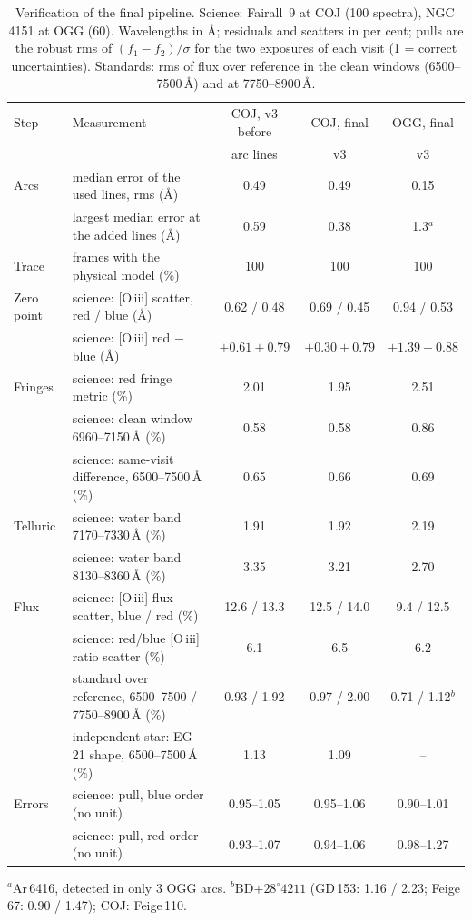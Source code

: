 \begin{table}[!htbp]
\centering
\caption{Verification of the final pipeline. Science: Fairall~9 at COJ (100 spectra), NGC\,4151 at OGG (60). Wavelengths
in \AA; residuals and scatters in per cent; pulls are the robust rms of $(f_1-f_2)/\sigma$ for the two exposures of
each visit (1 = correct uncertainties). Standards: rms of flux over reference in the clean windows (6500--7500\,\AA)
and at 7750--8900\,\AA.}
\label{tab:sites}
\small
\begin{tabular}{llccc}
\toprule
Step & Measurement & COJ, v3 before & COJ, final & OGG, final \\
 & & arc lines & v3 & v3 \\
\midrule
Arcs & median error of the used lines, rms (\AA) & 0.49 & 0.49 & 0.15 \\
 & largest median error at the added lines (\AA) & 0.59 & 0.38 & 1.3$^{a}$ \\
Trace & frames with the physical model (\%) & 100 & 100 & 100 \\
Zero point & science: [O\,{\sc iii}] scatter, red / blue (\AA) & 0.62 / 0.48 & 0.69 / 0.45 & 0.94 / 0.53 \\
 & science: [O\,{\sc iii}] red $-$ blue (\AA) & $+0.61\pm0.79$ & $+0.30\pm0.79$ & $+1.39\pm0.88$ \\
Fringes & science: red fringe metric (\%) & 2.01 & 1.95 & 2.51 \\
 & science: clean window 6960--7150\,\AA{} (\%) & 0.58 & 0.58 & 0.86 \\
 & science: same-visit difference, 6500--7500\,\AA{} (\%) & 0.65 & 0.66 & 0.69 \\
Telluric & science: water band 7170--7330\,\AA{} (\%) & 1.91 & 1.92 & 2.19 \\
 & science: water band 8130--8360\,\AA{} (\%) & 3.35 & 3.21 & 2.70 \\
Flux & science: [O\,{\sc iii}] flux scatter, blue / red (\%) & 12.6 / 13.3 & 12.5 / 14.0 & 9.4 / 12.5 \\
 & science: red/blue [O\,{\sc iii}] ratio scatter (\%) & 6.1 & 6.5 & 6.2 \\
 & standard over reference, 6500--7500 / 7750--8900\,\AA{} (\%) & 0.93 / 1.92 & 0.97 / 2.00 & 0.71 / 1.12$^{b}$ \\
 & independent star: EG\,21 shape, 6500--7500\,\AA{} (\%) & 1.13 & 1.09 & -- \\
Errors & science: pull, blue order (no unit) & 0.95--1.05 & 0.95--1.06 & 0.90--1.01 \\
 & science: pull, red order (no unit) & 0.93--1.07 & 0.94--1.06 & 0.98--1.27 \\
\bottomrule
\end{tabular}
\par\smallskip\raggedright\footnotesize
$^{a}$Ar\,6416, detected in only 3 OGG arcs. $^{b}$BD$+28^\circ4211$ (GD\,153: 1.16 / 2.23; Feige\,67: 0.90 / 1.47);
COJ: Feige\,110.
\end{table}

